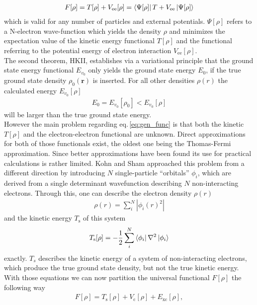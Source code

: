 \begin{align} \label{eq:gen_func}
    F[\rho] = T[\rho] + V_{\mathrm{ee}}[\rho] = \bra{\Psi[\rho]}T+V_{\mathrm{ee}}\ket{\Psi[\rho]}
\end{align}
which is valid for any number of particles and external potentials. $\Psi[\rho]$ refers to a N-electron wave-function which yields the density $\rho$ and minimizes the expectation value of the kinetic energy functional $T[\rho]$ and the functional referring to the potential energy of electron interaction $V_{\mathrm{ee}}[\rho]$. \\
The second theorem, HKII, establishes via a variational principle that the ground state energy functional $E_{v_0}$ only yields the ground state energy $E_{0}$, if the true ground state density $\rho_{0}(\textbf{r})$ is inserted. For all other densities $\rho(r)$ the calculated energy $E_{v_0}[\rho]$
\begin{align}
    E_{0} = E_{v_0}[\rho_{0}] < E_{v_0}[\rho]
\end{align}
will be larger than the true ground state energy. \\
However the main problem regarding eq.\,\ref{eq:gen_func} is that both the kinetic $T[\rho]$ and the electron-electron functional are unknown. Direct approximations for both of those functionals exist, the oldest one being the Thomas-Fermi approximation.\cite{DFT_4} Since better approximations have been found its use for practical calculations is rather limited.
Kohn and Sham approached this problem from a different direction by introducing $N$ single-particle ``orbitals'' $\phi_{i}$, which are derived from a single determinant wavefunction describing $N$ non-interacting electrons.\cite{DFT_5} Through this, one can describe the electron density $\rho(r)$
\begin{align}\label{eq:HK_orbitals}
    \rho(r) = \sum^{N}_{i} |{\phi_{i}(r)^2}|
\end{align}
and the kinetic energy $T_{\mathrm{s}}$ of this system
\begin{align}
    T_{\mathrm{s}}[\rho] = - \frac{1}{2}\sum^{N}_{i} \bra{\phi_{i}}\nabla^2\ket{\phi_{i}}
\end{align}
exactly. $T_{s}$ describes the kinetic energy of a system of non-interacting electrons, which produce the true ground state density, but not the true kinetic energy. \\
With those equations we can now partition the universal functional $F[\rho]$ the following way
\begin{align} \label{eq:KS_functional}
    F[\rho] = T_{\mathrm{s}}[\rho] + V_{\mathrm{c}}[\rho] + E_{\mathrm{xc}}[\rho],
\end{align}
